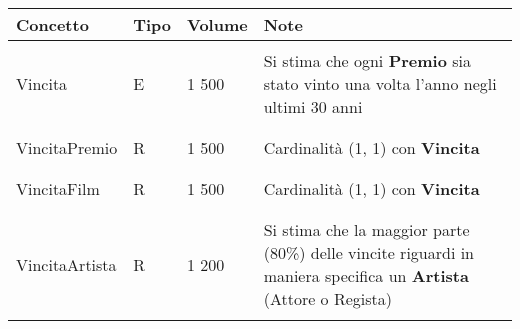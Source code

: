 \documentclass{article}
\begin{document}
\begin{tabular}{|C{2.3cm}|C{0.7cm}|C{1.7cm}|C{6.2cm}|}
\hline
    \textbf{Concetto} & \textbf{Tipo} & \textbf{Volume} & \textbf{Note} \\
\hline
\hline
& & & \\    
    Vincita & E & 1 500 & Si stima che ogni \textbf{Premio} sia stato vinto una volta l'anno negli ultimi 30 anni \\
& & & \\
\hline
& & & \\    
    VincitaPremio & R & 1 500 & Cardinalità (1, 1) con \textbf{Vincita} \\
& & & \\
\hline
& & & \\    
    VincitaFilm & R & 1 500 & Cardinalità (1, 1) con \textbf{Vincita} \\
& & & \\
\hline
& & & \\    
    VincitaArtista & R & 1 200 & Si stima che la maggior parte (80\%) delle vincite riguardi in maniera specifica un \textbf{Artista} (Attore o Regista)  \\
& & & \\
\hline 
\end{tabular}
\end{document}
